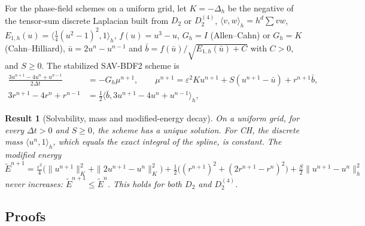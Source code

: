 \documentclass[11pt]{article}
\newtheorem{result}{Result}
\begin{document}
For the phase-field schemes on a uniform grid, let $K=-\Delta_h$ be the negative of the tensor-sum discrete
Laplacian built from $D_2$ or $D_2^{(4)}$, $\langle v,w\rangle_h=h^d\sum vw$,
$E_{1,h}(u)=\langle\frac14(u^2-1)^2,1\rangle_h$, $f(u)=u^3-u$, $G_h=I$ (Allen--Cahn) or $G_h=K$
(Cahn--Hilliard), $\bar u=2u^n-u^{n-1}$ and $\bar b=f(\bar u)/\sqrt{E_{1,h}(\bar u)+C}$ with $C>0$, and $S\ge0$.
The stabilized SAV-BDF2 scheme is
\begin{align}
\frac{3u^{n+1}-4u^n+u^{n-1}}{2\Delta t}&=-G_h\mu^{n+1},\qquad
\mu^{n+1}=\varepsilon^2Ku^{n+1}+S(u^{n+1}-\bar u)+r^{n+1}\bar b,\label{eq:sav1}\\
3r^{n+1}-4r^n+r^{n-1}&=\tfrac12\langle\bar b,3u^{n+1}-4u^n+u^{n-1}\rangle_h,\label{eq:sav2}
\end{align}
\begin{result}[Solvability, mass and modified-energy decay]\label{thm:energy}
On a uniform grid, for every $\Delta t>0$ and $S\ge0$, the scheme has a unique solution. For CH, the
discrete mass $\langle u^n,1\rangle_h$, which equals the exact integral of the spline, is constant. The
modified energy
\[
\tilde E^{n+1}=\tfrac{\varepsilon^2}{4}\big(\|u^{n+1}\|_K^2+\|2u^{n+1}-u^n\|_K^2\big)
+\tfrac12\big((r^{n+1})^2+(2r^{n+1}-r^n)^2\big)+\tfrac S2\|u^{n+1}-u^n\|_h^2
\]
never increases: $\tilde E^{n+1}\le\tilde E^n$. This holds for both $D_2$ and $D_2^{(4)}$.
\end{result}

\subsection*{Proofs}
\end{document}
